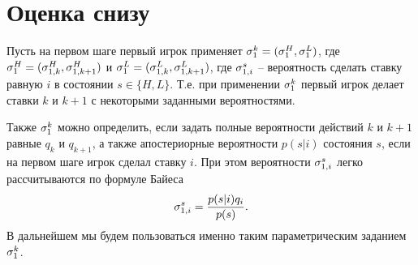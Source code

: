 \section{Оценка снизу}
\label{sec:lower_bound}

Пусть на первом шаге первый игрок применяет 
$ \sigma^k_1 = (\sigma^H_1, \sigma^L_1) $, где 
$ \sigma^H_1 = (\sigma^H_{1,k}, \sigma^H_{1,k+1}) $ и 
$ \sigma^L_1 = (\sigma^L_{1,k}, \sigma^L_{1,k+1}) $, где 
$ \sigma^s_{1,i} $ -- вероятность сделать ставку равную $ i $ в состоянии $ s \in \{ H, L \} $.
Т.е. при применении $ \sigma^k_1 $ первый игрок делает ставки $ k $ и $ k + 1 $ с некоторыми заданными вероятностями. 

Также $ \sigma^k_1 $ можно определить, если задать полные вероятности действий $ k $ и $ k + 1 $ равные $ q_k $ и $ q_{k+1} $, а также апостериорные вероятности $ p(s|i) $ состояния $ s $, если на первом шаге игрок сделал ставку $ i $. 
При этом вероятности $ \sigma^s_{1,i} $ легко рассчитываются по формуле Байеса
\[
    \sigma^s_{1,i} = \frac{p(s|i)q_i}{p(s)}.
\]
В дальнейшем мы будем пользоваться именно таким параметрическим заданием $ \sigma^k_1 $.

